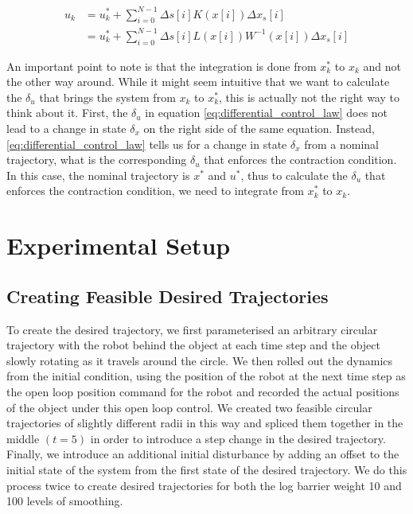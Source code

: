 \documentclass[journal]{IEEEtran}
\begin{document}
\begin{equation}
	\label{eq:control_law}
	\begin{aligned}
		u_k &= u^*_k + \sum_{i=0}^{N-1} \Delta s[i] K(x[i]) \Delta x_s[i]  \\
		&= u^*_k + \sum_{i=0}^{N-1} \Delta s[i] L(x[i]) W^{-1}(x[i]) \Delta x_s[i]
	\end{aligned}
\end{equation}

An important point to note is that the integration is done from $x^*_k$ to $x_k$ and not the other way around. While it might seem intuitive that we want to calculate the $\delta_u$ that brings the system from $x_k$ to $x^*_k$, this is actually not the right way to think about it. First, the $\delta_u$ in equation \ref{eq:differential_control_law} does not lead to a change in state $\delta_x$ on the right side of the same equation. Instead, \ref{eq:differential_control_law} tells us for a change in state $\delta_x$ from a nominal trajectory, what is the corresponding $\delta_u$ that enforces the contraction condition. In this case, the nominal trajectory is $x^*$ and $u^*$, thus to calculate the $\delta_u$ that enforces the contraction condition, we need to integrate from $x^*_k$ to $x_k$.

\section{Experimental Setup}
\subsection{Creating Feasible Desired Trajectories}
To create the desired trajectory, we first parameterised an arbitrary circular trajectory with the robot behind the object at each time step and the object slowly rotating as it travels around the circle. We then rolled out the dynamics from the initial condition, using the position of the robot at the next time step as the open loop position command for the robot and recorded the actual positions of the object under this open loop control. We created two feasible circular trajectories of slightly different radii in this way and spliced them together in the middle $(t=5)$ in order to introduce a step change in the desired trajectory. Finally, we introduce an additional initial disturbance by adding an offset to the initial state of the system from the first state of the desired trajectory. We do this process twice to create desired trajectories for both the log barrier weight 10 and 100 levels of smoothing.
\end{document}
